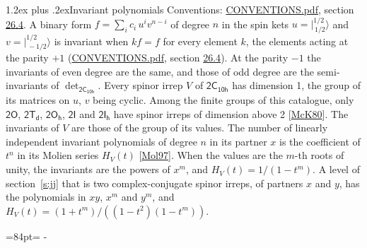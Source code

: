 \documentclass[10pt,a4paper]{article}
\makeatletter
\renewcommand\section{\@startsection{section}{1}{\z@}{-3ex plus -1ex minus -.2ex}%
  {1.2ex plus .2ex}{\normalfont\large\sffamily\bfseries\color{parttitle}}}
\newcommand{\needspace}[1]{\par\penalty-100\begingroup\dimen0=#1\relax\dimen2=\pagegoal
  \advance\dimen2-\pagetotal\ifdim\dimen0>\dimen2\relax\ifdim\dimen2>0pt\vfil\break\fi\fi
  \endgroup}
\numberwithin{equation}{section}
\newcommand{\grp}[1]{\mathsf{#1}}
\newcommand{\jm}[2]{\bigl\lvert{}^{#1}_{\,#2}\bigr\rangle}
\makeatother
\begin{document}
\section{Invariant polynomials}\label{s:invariants}
Conventions: \href{../../CONVENTIONS.pdf}{CONVENTIONS.pdf}, section \href{../../CONVENTIONS.pdf\#conv.26.4}{26.4}.
\leavevmode\label{n:local.binary.form}A binary form $f = \sum_i c_i\, u^i v^{n-i}$ of degree $n$ in the spin kets $u = \jm{1/2}{1/2}$ and $v = \jm{1/2}{-1/2}$ is invariant when $k f = f$ for every element $k$, the elements acting at the parity $+1$ (\href{../../CONVENTIONS.pdf}{CONVENTIONS.pdf}, section \href{../../CONVENTIONS.pdf\#conv.26.4}{26.4}). At the parity $-1$ the invariants of even degree are the same, and those of odd degree are the semi-invariants of $\det_{\grp{2C_{10h}}}$.
\leavevmode\label{n:function.hilbert}Every spinor irrep $V$ of $\grp{2C_{10h}}$ has dimension 1, the group of its matrices on $u$, $v$ being cyclic. Among the finite groups of this catalogue, only $\grp{2O}$, $\grp{2T_{d}}$, $\grp{2O_{h}}$, $\grp{2I}$ and $\grp{2I_{h}}$ have spinor irreps of dimension above 2 [\href{../../../REFERENCES.pdf\#ref.McK80}{McK80}]. The invariants of $V$ are those of the group of its values. \label{n:local.partner.x}The number of linearly independent invariant polynomials of degree $n$ in its partner $x$ is the coefficient of $t^n$ in its Molien series $H_V(t)$ [\href{../../../REFERENCES.pdf\#ref.Mol97}{Mol97}]. When the values are the $m$-th roots of unity, the invariants are the powers of $x^{m}$, and $H_V(t) = 1/(1 - t^{m})$. A level of section~\ref{s:jj} that is two complex-conjugate spinor irreps, of partners $x$ and $y$, has the polynomials in $xy$, $x^{m}$ and $y^{m}$, and $H_V(t) = (1 + t^{m})/((1 - t^{2})(1 - t^{m}))$.
\needspace{84pt}
\end{document}

